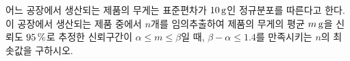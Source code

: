 어느 공장에서 생산되는 제품의 무게는 표준편차가 $10\mkern3mu \mathrm{g}$인 정규분포를 따른다고 한다. 이 공장에서 생산되는 제품 중에서 $n$개를 임의추출하여 제품의 무게의 평균 $m\mkern3mu \mathrm{g}$을 신뢰도 $95\mkern3mu \%$로 추정한 신뢰구간이 $\alpha\le m\le\beta$일 때, $\beta-\alpha\le 1.4$를 만족시키는 $n$의 최솟값을 구하시오. 

